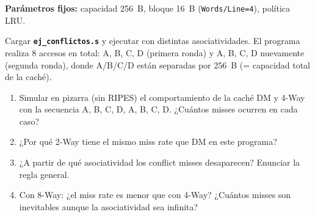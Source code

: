\documentclass[12pt, a4paper]{article}
\newcommand{\archivo}[1]{\texttt{\textbf{#1}}}
\begin{document}
\begin{ejercicio}
    \textbf{Parámetros fijos:} capacidad 256~B, bloque 16~B (\texttt{Words/Line=4}),
    política LRU.

    Cargar \archivo{ej\_conflictos.s} y ejecutar con distintas asociatividades.
    El programa realiza 8 accesos en total: A, B, C, D (primera ronda) y
    A, B, C, D nuevamente (segunda ronda), donde A/B/C/D están separadas
    por 256~B (= capacidad total de la caché).

    \vspace{0.3cm}
    \begin{center}
    \renewcommand{\arraystretch}{1.8}
    \end{center}

    \vspace{0.2cm}
    \begin{enumerate}
        \item Simular en pizarra (sin RIPES) el comportamiento de la caché
              DM y 4-Way con la secuencia A, B, C, D, A, B, C, D.
              ¿Cuántos misses ocurren en cada caso?
        \item ¿Por qué 2-Way tiene el mismo miss rate que DM en este programa?
        \item ¿A partir de qué asociatividad los conflict misses desaparecen?
              Enunciar la regla general.
        \item Con 8-Way: ¿el miss rate es menor que con 4-Way?
              ¿Cuántos misses son inevitables aunque la asociatividad sea infinita?
    \end{enumerate}
\end{ejercicio}
\end{document}
